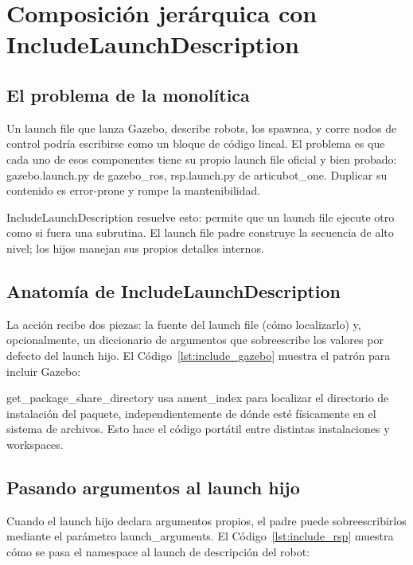 \section{Composición jerárquica con IncludeLaunchDescription}

\subsection{El problema de la monolítica}

Un launch file que lanza Gazebo, describe robots, los spawnea, y corre nodos de control podría escribirse como un bloque de código lineal. El problema es que cada uno de esos componentes tiene su propio launch file oficial y bien probado: gazebo.launch.py de gazebo\_ros, rsp.launch.py de articubot\_one. Duplicar su contenido es error-prone y rompe la mantenibilidad.

IncludeLaunchDescription resuelve esto: permite que un launch file ejecute otro como si fuera una subrutina. El launch file padre construye la secuencia de alto nivel; los hijos manejan sus propios detalles internos.

\subsection{Anatomía de IncludeLaunchDescription}

La acción recibe dos piezas: la fuente del launch file (cómo localizarlo) y, opcionalmente, un diccionario de argumentos que sobreescribe los valores por defecto del launch hijo. El Código~\ref{lst:include_gazebo} muestra el patrón para incluir Gazebo:



get\_package\_share\_directory usa ament\_index para localizar el directorio de instalación del paquete, independientemente de dónde esté físicamente en el sistema de archivos. Esto hace el código portátil entre distintas instalaciones y workspaces.

\subsection{Pasando argumentos al launch hijo}

Cuando el launch hijo declara argumentos propios, el padre puede sobreescribirlos mediante el parámetro launch\_arguments. El Código~\ref{lst:include_rsp} muestra cómo se pasa el namespace al launch de descripción del robot:



